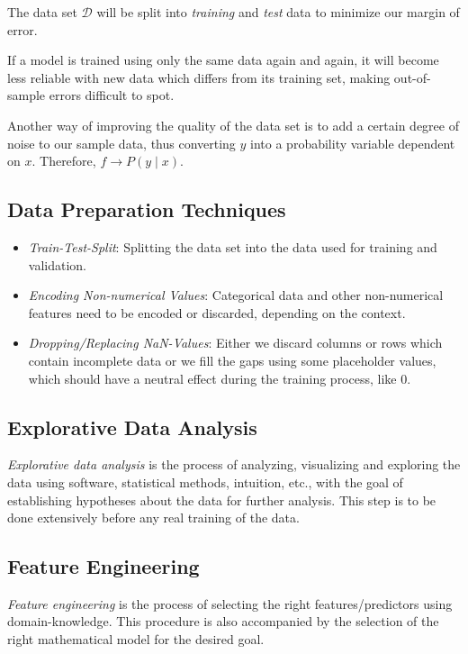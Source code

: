 The data set \(\mathcal{D}\) will be split into \emph{training} and \emph{test} data to minimize our
margin of error. 

If a model is trained using only the same data again and again, it will become
less reliable with new data which differs from its training set, making out-of-sample errors
difficult to spot.

Another way of improving the quality of the data set is to add a certain degree of noise to our sample data, thus
converting \(y\) into a probability variable dependent on \(x\). Therefore, \(f \to P(y \mid x)\).

\subsection{Data Preparation Techniques}

\begin{itemize}
	\item \emph{Train-Test-Split}: Splitting the data set into the data used for training and validation.

	\item \emph{Encoding Non-numerical Values}: Categorical data and other non-numerical features need to be encoded or discarded, depending on the context.

	\item \emph{Dropping/Replacing NaN-Values}: Either we discard columns or rows which contain incomplete data or we fill the gaps using some placeholder values, which 
	should have a neutral effect during the training process, like 0.  

\end{itemize}

\subsection{Explorative Data Analysis}

\emph{Explorative data analysis} is the process of analyzing, visualizing and exploring the data using software, statistical methods, intuition, etc., with
the goal of establishing hypotheses about the data for further analysis. This step is to be done extensively before any real 
training of the data.

\subsection{Feature Engineering}

\emph{Feature engineering} is the process of selecting the right features/predictors using domain-knowledge. This
procedure is also accompanied by the selection of the right mathematical model for the desired goal.

